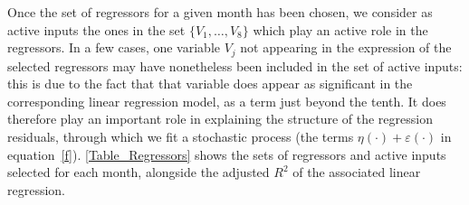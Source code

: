 \documentclass[a4paper, 12pt]{article}
\newcommand{\eps}{\varepsilon}
\begin{document}
Once the set of regressors for a given month has been chosen, we consider as active inputs the ones in the set $\{V_1, \dots, V_8\}$ which play an active role in the regressors. In a few cases, one variable $V_j$ not appearing in the expression of the selected regressors may have nonetheless been included in the set of active inputs: this is due to the fact that that variable does appear as significant in the corresponding linear regression model, as a term just beyond the tenth. It does therefore play an important role in explaining the structure of the regression residuals, through which we fit a stochastic process (the terms $ \eta(\cdot) + \eps(\cdot)$ in equation~\eqref{f}).
\autoref{Table_Regressors} shows the sets of regressors and active inputs selected for each month, alongside the adjusted $R^2$ of the associated linear regression.
\end{document}
